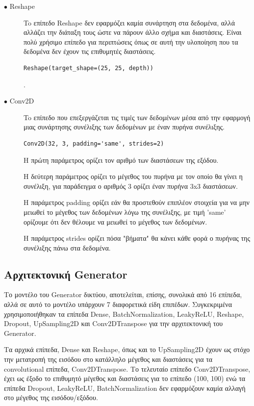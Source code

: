\begin{description}
\item[$\bullet$ Reshape] To επίπεδο Reshape δεν εφαρμόζει καμία συνάρτηση στα δεδομένα, αλλά αλλάζει την διάταξη τους ώστε να πάρουν άλλο σχήμα και διαστάσεις. Είναι πολύ χρήσιμο επίπεδο για περιπτώσεις όπως σε αυτή την υλοποίηση που τα δεδομένα δεν έχουν τις επιθυμητές διαστάσεις.
\begin{verbatim}
Reshape(target_shape=(25, 25, depth))
\end{verbatim}. 
\end{description}

\begin{description}
\item[$\bullet$ Conv2D] To επίπεδο που επεξεργάζεται τις τιμές των δεδομένων μέσα από την εφαρμογή μιας συνάρτησης συνέλιξης των δεδομένων με έναν πυρήνα συνέλιξης. \cite{conv2d}
\par
\begin{verbatim}
Conv2D(32, 3, padding='same', strides=2)
\end{verbatim}
\par
Η πρώτη παράμετρος ορίζει τον αριθμό των διαστάσεων της εξόδου.
\par
Η δεύτερη παράμετρος ορίζει το μέγεθος του πυρήνα με τον οποίο θα γίνει η συνέλιξη, για παράδειγμα ο αριθμός 3 ορίζει έναν πυρήνα 3x3 διαστάσεων.
\par
H παράμετρος padding ορίζει εάν θα προστεθούν επιπλέον στοιχεία για να μην μειωθεί το μέγεθος των δεδομένων λόγω της συνέλιξης, με τιμή 'same' ορίζουμε ότι δεν θέλουμε να μειωθεί το μέγεθος των δεδομένων.
\par
H παράμετρος strides ορίζει πόσα "βήματα" θα κάνει κάθε φορά ο πυρήνας της συνέλιξης πάνω στα δεδομένα.
\end{description}

\subsection{Αρχιτεκτονική Generator}
Το μοντέλο του Generator δικτύου, αποτελείται, επίσης, συνολικά από 16 επίπεδα, αλλά σε αυτό το μοντέλο υπάρχουν 7 διαφορετικά είδη επιπέδων. Συγκεκριμένα χρησιμοποιήθηκαν τα επίπεδα Dense, BatchNormalization, LeakyReLU, Reshape, Dropout, UpSampling2D και Conv2DTranspose για την αρχιτεκτονική του Generator.
\par
Τα αρχικά επίπεδα, Dense και Reshape, όπως και το UpSampling2D έχουν ως στόχο την μετατροπή της εισόδου στο κατάλληλο μέγεθος και διαστάσεις για τα convolutional επίπεδα, Conv2DTranspose. Το τελευταίο επίπεδο Conv2DTranspose, έχει ως έξοδο το επιθυμητό μέγεθος και διαστάσεις για το επίπεδο (100, 100) ενώ τα επίπεδα Dropout, LeakyReLU, BatchNormalization δεν εφαρμόζουν καμία αλλαγή στο μέγεθος της εισόδου/εξόδου.
\par

